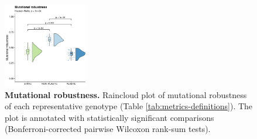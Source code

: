 \begin{figure}[ht!]
    \centering
    \includegraphics[width=0.33\textwidth]{media-mutational-robustness.pdf}
    \caption{\small
        \textbf{Mutational robustness.}
        Raincloud plot of mutational robustness of each representative genotype (Table \ref{tab:metrics-definitions}).
        The plot is annotated with statistically significant comparisons (Bonferroni-corrected pairwise Wilcoxon rank-sum tests).
    }
    \label{fig:mutational-robustness}
\end{figure}